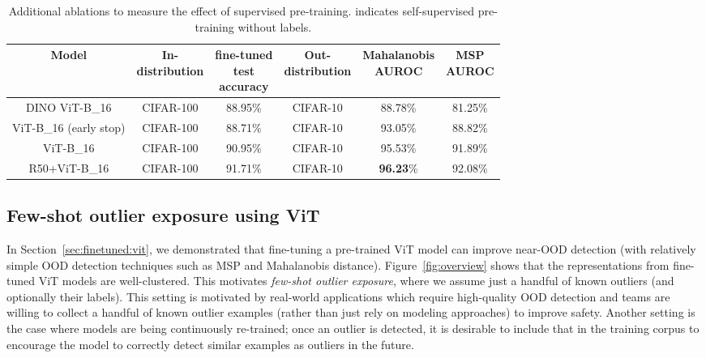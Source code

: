 \documentclass{article}
\newcommand{\test}{\mathcal{D_{\mathrm{test}}}}
\begin{document}
\begin{table}[h]
\begin{center}	
\vspace{-1em}
\caption{Additional ablations to measure the effect of supervised pre-training.  indicates self-supervised pre-training without labels.
}
\begin{tabular}{ c|c|c|c|c|c } 
	Model & \makecell{In-\\distribution} & \makecell{fine-tuned\\test\\accuracy} & \makecell{Out-\\distribution} & \makecell{Mahalanobis\\AUROC} & \makecell{MSP\\AUROC} \\
	\hline
DINO ViT-B\_16 & CIFAR-100 & 88.95\% & CIFAR-10 & 88.78\% & 81.25\% \\
	ViT-B\_16 (early stop) & CIFAR-100 & 88.71\% & CIFAR-10 & 93.05\% & 88.82\% \\
ViT-B\_16 & CIFAR-100 & 90.95\% & CIFAR-10 & 95.53\% & 91.89\% \\
	R50+ViT-B\_16 & CIFAR-100 & 91.71\% & CIFAR-10 & \textbf{96.23}\% & 92.08\% \\
\bottomrule
\end{tabular}
\vspace{-1em}
\label{tab:pretraining:ablations}
\end{center}
\end{table}














\vspace{-0.5em}
\subsection{Few-shot outlier exposure using ViT}


\vspace{-0.5em}


In Section~\ref{sec:finetuned:vit}, we demonstrated that fine-tuning a pre-trained ViT model can improve near-OOD detection (with relatively simple OOD detection techniques such as MSP and Mahalanobis distance). Figure~\ref{fig:overview} shows that the representations from fine-tuned ViT models are well-clustered. This motivates \textit{few-shot outlier exposure}, where we assume just a handful of  known outliers (and optionally their labels). This setting is motivated by real-world applications which require high-quality OOD detection and teams are willing  to collect a handful of known outlier examples (rather than just rely on modeling approaches) to improve safety. Another setting is the case where models are being continuously re-trained; once an outlier is detected, it is desirable to include that in the training corpus to encourage the model to correctly detect similar examples as outliers in the future.  
\end{document}
